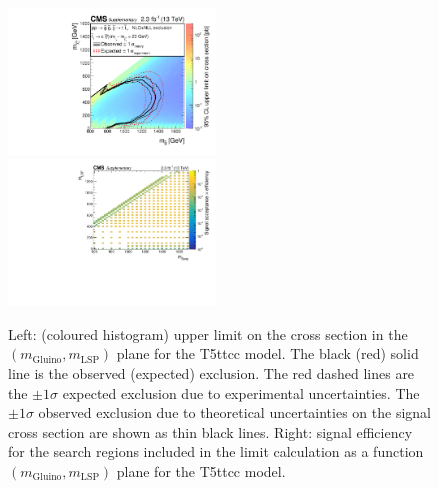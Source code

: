\clearpage
\begin{figure}[t]
  \begin{center}
    \includegraphics[width=0.49\textwidth]{RA1T5ttccXSEC_aux} \, 
    \includegraphics[width=0.49\textwidth]{T5ttcc_merging_4_cats_aux} \,     
  \end{center}
  \caption{Left: (coloured histogram) upper limit on the cross section in the $(m_{\mathrm{Gluino}},m_{\mathrm{LSP}})$ plane for the T5ttcc model. 
  The black (red) solid line is the observed (expected) exclusion. The red dashed lines are the $\pm1\sigma$ expected exclusion due to experimental uncertainties. 
  The $\pm1\sigma$ observed exclusion due to theoretical uncertainties on the signal cross section are shown as thin black lines. 
  Right: signal efficiency for the search regions included in the limit calculation as a function $(m_{\mathrm{Gluino}},m_{\mathrm{LSP}})$ plane for the T5ttcc model. 
  \label{fig:T5ttcc_excl}}
\end{figure}

